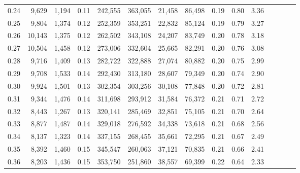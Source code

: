 \begin{tabular}{rrrcrrrrrrrrrrr}
0.24 &   9,629 &   1,194 &                                       0.11 &  242,555 &  363,055 &   21,458 &   86,498 &  0.19 &  0.80 &                         3.36 \\
0.25 &   9,804 &   1,374 &                                       0.12 &  252,359 &  353,251 &   22,832 &   85,124 &  0.19 &  0.79 &                         3.27 \\
0.26 &  10,143 &   1,375 &                                       0.12 &  262,502 &  343,108 &   24,207 &   83,749 &  0.20 &  0.78 &                         3.18 \\
0.27 &  10,504 &   1,458 &                                       0.12 &  273,006 &  332,604 &   25,665 &   82,291 &  0.20 &  0.76 &                         3.08 \\
0.28 &   9,716 &   1,409 &                                       0.13 &  282,722 &  322,888 &   27,074 &   80,882 &  0.20 &  0.75 &                         2.99 \\
0.29 &   9,708 &   1,533 &                                       0.14 &  292,430 &  313,180 &   28,607 &   79,349 &  0.20 &  0.74 &                         2.90 \\
0.30 &   9,924 &   1,501 &                                       0.13 &  302,354 &  303,256 &   30,108 &   77,848 &  0.20 &  0.72 &                         2.81 \\
0.31 &   9,344 &   1,476 &                                       0.14 &  311,698 &  293,912 &   31,584 &   76,372 &  0.21 &  0.71 &                         2.72 \\
0.32 &   8,443 &   1,267 &                                       0.13 &  320,141 &  285,469 &   32,851 &   75,105 &  0.21 &  0.70 &                         2.64 \\
0.33 &   8,877 &   1,487 &                                       0.14 &  329,018 &  276,592 &   34,338 &   73,618 &  0.21 &  0.68 &                         2.56 \\
0.34 &   8,137 &   1,323 &                                       0.14 &  337,155 &  268,455 &   35,661 &   72,295 &  0.21 &  0.67 &                         2.49 \\
0.35 &   8,392 &   1,460 &                                       0.15 &  345,547 &  260,063 &   37,121 &   70,835 &  0.21 &  0.66 &                         2.41 \\
0.36 &   8,203 &   1,436 &                                       0.15 &  353,750 &  251,860 &   38,557 &   69,399 &  0.22 &  0.64 &                         2.33 \\

\end{tabular}
